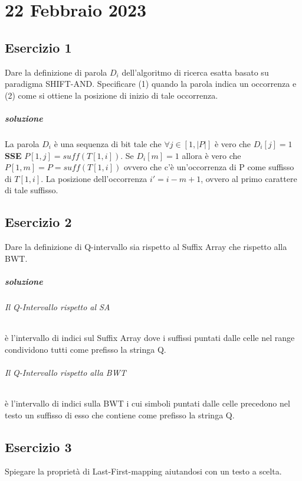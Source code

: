 \chapter{22 Febbraio 2023}

\section{Esercizio 1}

Dare la definizione di parola $D_i$ dell'algoritmo di ricerca esatta basato su paradigma SHIFT-AND. Specificare (1) quando la parola indica un occorrenza e (2) come si ottiene la posizione di inizio di tale occorrenza.

\paragraph{soluzione}

La parola $D_i$ \`e una sequenza di bit tale che $\forall j \in [1,|P|]$ \`e vero che $D_i[j] = 1$ \textbf{SSE} $P[1,j] = suff(T[1,i])$. Se $D_i[m] = 1$ allora \`e vero che $P[1,m] = P = suff(T[1,i])$ ovvero che c'\`e un'occorrenza di P come suffisso di $T[1,i]$. La posizione dell'occorrenza $i' = i - m + 1$, ovvero al primo carattere di tale suffisso.

\section{Esercizio 2}

Dare la definizione di Q-intervallo sia rispetto al Suffix Array che rispetto alla BWT.

\paragraph{soluzione}

\subparagraph{Il Q-Intervallo rispetto al SA} \`e l'intervallo di indici sul Suffix Array dove i suffissi puntati dalle celle nel range condividono tutti come prefisso la stringa Q.

\subparagraph{Il Q-Intervallo rispetto alla BWT} \`e l'intervallo di indici sulla BWT i cui simboli puntati dalle celle precedono nel testo un suffisso di esso che contiene come prefisso la stringa Q.

\section{Esercizio 3}

Spiegare la proprietà di Last-First-mapping aiutandosi con un testo a scelta.

